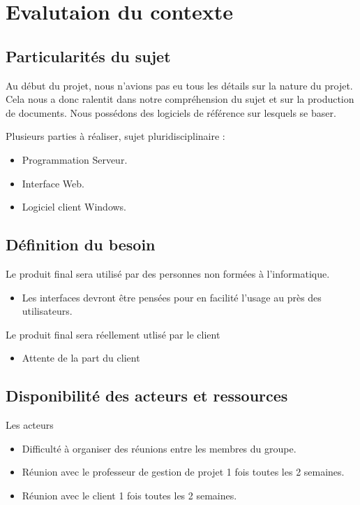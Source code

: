 \chapter{Evalutaion du contexte}

\section{Particularités du sujet}
Au début du projet, nous n'avions pas eu tous les détails sur la nature du projet. Cela nous a donc ralentit
dans notre compréhension du sujet et sur la production de documents.
Nous possédons des logiciels de référence sur lesquels se baser.\\ \newline

Plusieurs parties à réaliser, sujet pluridisciplinaire :
\begin{itemize}
	\item Programmation Serveur.
	\item Interface Web.
	\item Logiciel client Windows.
\end{itemize}

\section{Définition du besoin}
Le produit final sera utilisé par des personnes non formées à l'informatique. 
\begin{itemize}	
	\item Les interfaces devront être pensées pour en facilité l'usage au près des utilisateurs.\newline
\end{itemize}

Le produit final sera réellement utlisé par le client
\begin{itemize}
	\item Attente de la part du client
\end{itemize}

\section{Disponibilité des acteurs et ressources}
Les acteurs
\begin{itemize}
	\item Difficulté à organiser des réunions entre les membres du groupe.
	\item Réunion avec le professeur de gestion de projet 1 fois toutes les 2 semaines. 
	\item Réunion avec le client 1 fois toutes les 2 semaines.\newline
\end{itemize}

